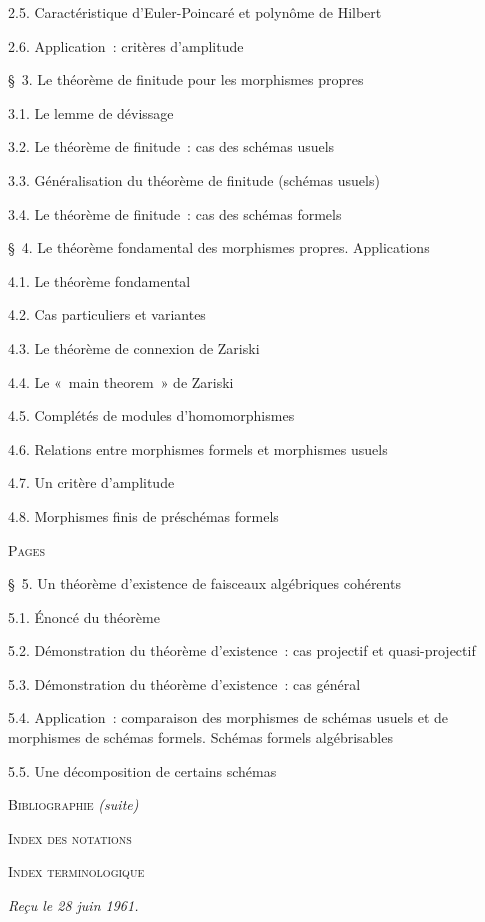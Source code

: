 \begin{flushleft}
2.5. Caractéristique d'Euler-Poincaré et polynôme de Hilbert 

2.6. Application~: critères d'amplitude 

\medskip
\S~3. Le théorème de finitude pour les morphismes propres 

3.1. Le lemme de dévissage 

3.2. Le théorème de finitude~: cas des schémas usuels 

3.3. Généralisation du théorème de finitude (schémas usuels) 

3.4. Le théorème de finitude~: cas des schémas formels 

\medskip
\S~4. Le théorème fondamental des morphismes propres. Applications 

4.1. Le théorème fondamental 

4.2. Cas particuliers et variantes 

4.3. Le théorème de connexion de Zariski 

4.4. Le «~main theorem~» de Zariski 

4.5. Complétés de modules d'homomorphismes 

4.6. Relations entre morphismes formels et morphismes usuels 

4.7. Un critère d'amplitude 

4.8. Morphismes finis de préschémas formels 


\hfill\textsc{Pages}

\S~5. Un théorème d'existence de faisceaux algébriques cohérents 

5.1. Énoncé du théorème 

5.2. Démonstration du théorème d'existence~: cas projectif et quasi-projectif

5.3. Démonstration du théorème d'existence~: cas général 

5.4. Application~: comparaison des morphismes de schémas usuels et de
morphismes de schémas formels. Schémas formels algébrisables 

5.5. Une décomposition de certains schémas 

\medskip
\textsc{Bibliographie} \textit{(suite)} 

\textsc{Index des notations} 

\textsc{Index terminologique} 

\begin{flushright}
\emph{Reçu le 28 juin 1961.}
\end{flushright}
\end{flushleft}
